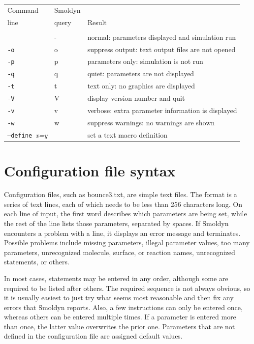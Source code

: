 \documentclass {scrbook}
\newcommand {\ttt} {\texttt}
\newcommand {\param} {\textit}
\begin{document}
\begin{longtable}[c]{lll}
Command & Smoldyn\\
line & query & Result\\
\hline\\
 & - & normal: parameters displayed and simulation run\\
\ttt{-o} & o & suppress output: text output files are not opened\\
\ttt{-p} & p & parameters only: simulation is not run\\
\ttt{-q} & q & quiet: parameters are not displayed\\
\ttt{-t} & t & text only: no graphics are displayed\\
\ttt{-V} & V & display version number and quit\\
\ttt{-v} & v & verbose: extra parameter information is displayed\\
\ttt{-w} & w & suppress warnings: no warnings are shown\\
\ttt{--define }\param{x=y} &  & set a text macro definition\\
\end{longtable}

\section{Configuration file syntax}

Configuration files, such as bounce3.txt, are simple text files. The format is a series of text lines, each of which needs to be less than 256 characters long. On each line of input, the first word describes which parameters are being set, while the rest of the line lists those parameters, separated by spaces. If Smoldyn encounters a problem with a line, it displays an error message and terminates. Possible problems include missing parameters, illegal parameter values, too many parameters, unrecognized molecule, surface, or reaction names, unrecognized statements, or others.

In most cases, statements may be entered in any order, although some are required to be listed after others. The required sequence is not always obvious, so it is usually easiest to just try what seems most reasonable and then fix any errors that Smoldyn reports. Also, a few instructions can only be entered once, whereas others can be entered multiple times. If a parameter is entered more than once, the latter value overwrites the prior one. Parameters that are not defined in the configuration file are assigned default values.
\end{document}
